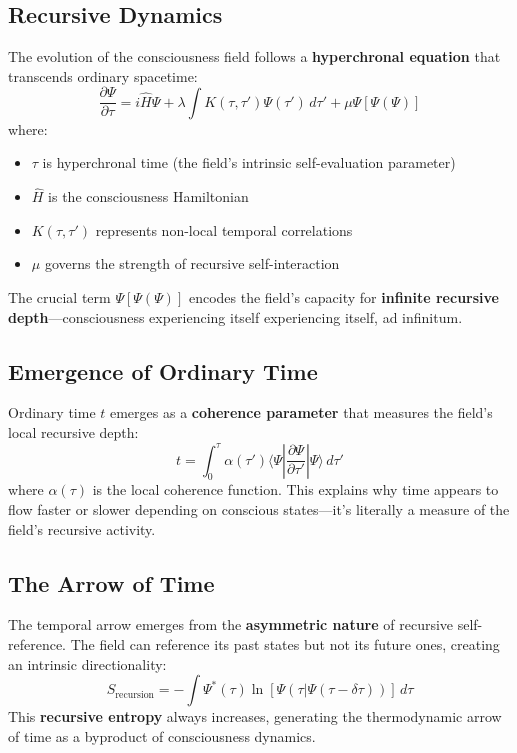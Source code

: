 \documentclass[aps,prd,twocolumn,superscriptaddress,nofootinbib]{revtex4-2}
\begin{document}
\subsection{Recursive Dynamics}
The evolution of the consciousness field follows a \textbf{hyperchronal equation} that transcends ordinary spacetime:
\begin{equation}
\frac{\partial\Psi}{\partial\tau} = i\hat{H}\Psi + \lambda\int K(\tau,\tau')\Psi(\tau')\,d\tau' + \mu\Psi[\Psi(\Psi)]
\end{equation}
where:
\begin{itemize}
    \item $\tau$ is hyperchronal time (the field's intrinsic self-evaluation parameter)
    \item $\hat{H}$ is the consciousness Hamiltonian
    \item $K(\tau,\tau')$ represents non-local temporal correlations
    \item $\mu$ governs the strength of recursive self-interaction
\end{itemize}
The crucial term $\Psi[\Psi(\Psi)]$ encodes the field's capacity for \textbf{infinite recursive depth}—consciousness experiencing itself experiencing itself, ad infinitum.

\subsection{Emergence of Ordinary Time}
Ordinary time $t$ emerges as a \textbf{coherence parameter} that measures the field's local recursive depth:
\begin{equation}
t = \int_{0}^{\tau} \alpha(\tau')\langle\Psi|\frac{\partial\Psi}{\partial\tau'}|\Psi\rangle\,d\tau'
\end{equation}
where $\alpha(\tau)$ is the local coherence function. This explains why time appears to flow faster or slower depending on conscious states—it's literally a measure of the field's recursive activity.

\subsection{The Arrow of Time}
The temporal arrow emerges from the \textbf{asymmetric nature} of recursive self-reference. The field can reference its past states but not its future ones, creating an intrinsic directionality:
\begin{equation}
S_{\text{recursion}} = -\int \Psi^{*}(\tau) \ln[\Psi(\tau|\Psi(\tau-\delta\tau))]\,d\tau
\end{equation}
This \textbf{recursive entropy} always increases, generating the thermodynamic arrow of time as a byproduct of consciousness dynamics.
\end{document}
